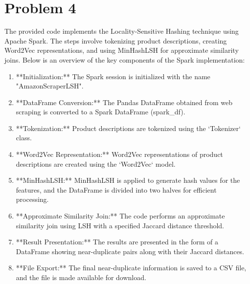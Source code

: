 	\newpage
	\section*{Problem 4}\label{sec:prob-4}
	The provided code implements the Locality-Sensitive Hashing technique using Apache Spark. The steps involve tokenizing product descriptions, creating Word2Vec representations, and using MinHashLSH for approximate similarity joins. Below is an overview of the key components of the Spark implementation:
	
	\begin{enumerate}
	    \item **Initialization:**
	    The Spark session is initialized with the name "AmazonScraperLSH".
	
	    \item **DataFrame Conversion:**
	    The Pandas DataFrame obtained from web scraping is converted to a Spark DataFrame (spark\_df).
	
	    \item **Tokenization:**
	    Product descriptions are tokenized using the `Tokenizer` class.
	
	    \item **Word2Vec Representation:**
	    Word2Vec representations of product descriptions are created using the `Word2Vec` model.
	
	    \item **MinHashLSH:**
	    MinHashLSH is applied to generate hash values for the features, and the DataFrame is divided into two halves for efficient processing.
	
	    \item **Approximate Similarity Join:**
	    The code performs an approximate similarity join using LSH with a specified Jaccard distance threshold.
	
	    \item **Result Presentation:**
	    The results are presented in the form of a DataFrame showing near-duplicate pairs along with their Jaccard distances.
	
	    \item **File Export:**
	    The final near-duplicate information is saved to a CSV file, and the file is made available for download.
	\end{enumerate}
